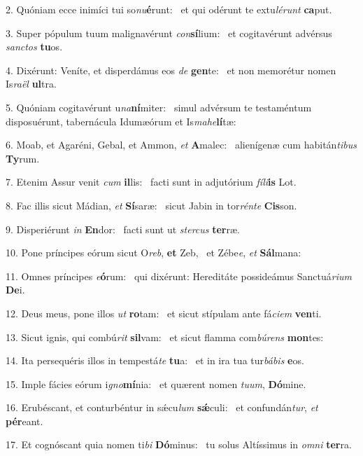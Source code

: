 2. Quóniam ecce inimíci tui so\textit{nu}\textbf{é}runt: \ast\  et qui odérunt te extu\textit{lé}\textit{runt} \textbf{ca}put.\

3. Super pópulum tuum malignavérunt \textit{con}\textbf{sí}lium: \ast\  et cogitavérunt advérsus \textit{sanc}\textit{tos} \textbf{tu}os.\

4. Dixérunt: Veníte, et disperdámus eos \textit{de} \textbf{gen}te: \ast\  et non memorétur nomen Is\textit{ra}\textit{ël} \textbf{ul}tra.\

5. Quóniam cogitavérunt u\textit{na}\textbf{ní}miter: \ast\  simul advérsum te testaméntum disposuérunt, tabernácula Idumæórum et Is\textit{ma}\textit{he}\textbf{lí}tæ:\

6. Moab, et Agaréni, Gebal, et Ammon, \textit{et} \textbf{A}malec: \ast\  alienígenæ cum habitán\textit{ti}\textit{bus} \textbf{Ty}rum.\

7. Etenim Assur venit \textit{cum} \textbf{il}lis: \ast\  facti sunt in adjutórium \textit{fí}\textit{li}\textbf{is} Lot.\

8. Fac illis sicut Mádian, \textit{et} \textbf{Sí}saræ: \ast\  sicut Jabin in tor\textit{rén}\textit{te} \textbf{Cis}son.\

9. Disperiérunt \textit{in} \textbf{En}dor: \ast\  facti sunt ut \textit{ster}\textit{cus} \textbf{ter}ræ.\

10. Pone príncipes eórum sicut O\textit{reb}, \textbf{et} Zeb, \ast\  et Zébe\textit{e}, \textit{et} \textbf{Sál}mana:\

11. Omnes príncipes \textit{e}\textbf{ó}rum: \ast\  qui dixérunt: Hereditáte possideámus Sanctuá\textit{ri}\textit{um} \textbf{De}i.\

12. Deus meus, pone illos \textit{ut} \textbf{ro}tam: \ast\  et sicut stípulam ante fá\textit{ci}\textit{em} \textbf{ven}ti.\

13. Sicut ignis, qui combú\textit{rit} \textbf{sil}vam: \ast\  et sicut flamma com\textit{bú}\textit{rens} \textbf{mon}tes:\

14. Ita persequéris illos in tempestá\textit{te} \textbf{tu}a: \ast\  et in ira tua tur\textit{bá}\textit{bis} \textbf{e}os.\

15. Imple fácies eórum i\textit{gno}\textbf{mí}nia: \ast\  et quærent nomen \textit{tu}\textit{um}, \textbf{Dó}mine.\

16. Erubéscant, et conturbéntur in sǽcu\textit{lum} \textbf{sǽ}culi: \ast\  et confundán\textit{tur}, \textit{et} \textbf{pér}eant.\

17. Et cognóscant quia nomen ti\textit{bi} \textbf{Dó}minus: \ast\  tu solus Altíssimus in \textit{om}\textit{ni} \textbf{ter}ra.\

